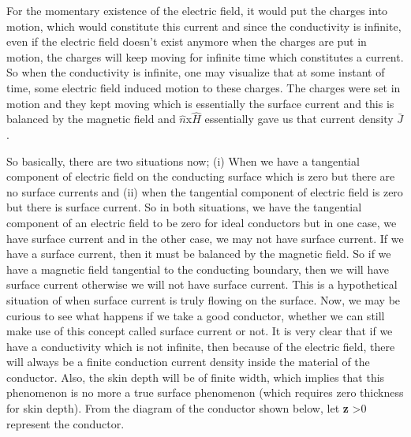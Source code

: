 For the momentary existence of the electric field, it would put the charges into motion, which would constitute this current and since the conductivity is infinite, even if the electric field doesn't exist anymore when the charges are put in motion, the charges will keep moving for infinite time which constitutes a current. So when the conductivity is infinite, one may visualize that at some instant of time, some electric field induced motion to these charges. The charges were set in motion and they kept moving which is essentially the surface current and this is balanced by the magnetic field and $\hat{n}$x$\hat{H}$ essentially gave us that current density $\bar{J}$.

So basically, there are two situations now; (i) When we have a tangential component of electric field on the conducting surface which is zero but there are no surface currents and (ii) when the tangential component of electric field is zero but there is surface current. So in both situations, we have the tangential component of an electric field to be zero for ideal conductors but in one case, we have surface current and in the other case, we may not have surface current. If we have a surface current, then it must be balanced by the magnetic field. So if we have a magnetic field tangential to the conducting boundary, then we will have surface current otherwise we will not have surface current. This is a hypothetical situation of when surface current is truly flowing on the surface. Now, we may be curious to see what happens if we take a good conductor, whether we can still make use of this concept called surface current or not. It is very clear that if we have a conductivity which is not infinite, then because of the electric field, there will always be a finite conduction current density inside the material of the conductor. Also, the skin depth will be of finite width, which implies that this phenomenon is no more a true surface phenomenon (which requires zero thickness for skin depth). From the diagram of the conductor shown below, let \textbf{z} \textgreater 0 represent the conductor.
